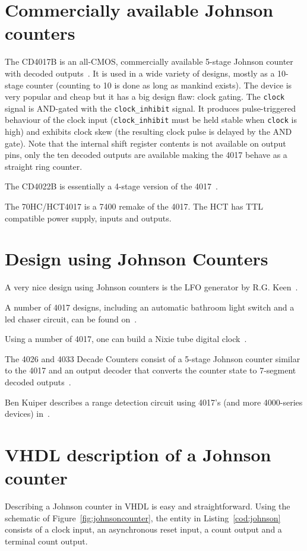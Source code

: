 \documentclass[12pt,a4paper,final,twoside,fleqn]{article}
\begin{document}
\section{Commercially available Johnson counters}
The CD4017B is an all-CMOS, commercially available 5-stage Johnson counter with
decoded outputs~\cite{datasheetcd4017b}. It is used in a wide variety of designs,
mostly as a 10-stage counter (counting to 10 is done as long as mankind exists).
The device is very popular and cheap but it has a big design flaw: clock gating.
The \lstinline|clock| signal is AND-gated with the \lstinline|clock_inhibit|
signal. It produces pulse-triggered behaviour of the clock input
(\lstinline|clock_inhibit| must be held stable when \lstinline|clock| is high) and
exhibits clock skew (the resulting clock pulse is delayed by the AND gate). Note
that the internal shift register contents is not available on output pins, only the
ten decoded outputs are available making the 4017 behave as a straight ring counter. 

The CD4022B is essentially a 4-stage version of the 4017~\cite{datasheetcd4022b}.

The 70HC/HCT4017 is a 7400 remake of the 4017. The HCT has TTL compatible power
supply, inputs and outputs.


\section{Design using Johnson Counters}
A very nice design using Johnson counters is the LFO generator by R.G. Keen~\cite{keen2015}.

A number of 4017 designs, including an automatic bathroom light switch and a
led chaser circuit, can be found on~\cite{electroschematics2015}.

Using a number of 4017, one can build a Nixie tube digital clock~\cite{harrison2015}.

The 4026 and 4033 Decade Counters consist of a 5-stage Johnson counter similar
to the 4017 and an output decoder that converts the counter state to 7-segment
decoded outputs~\cite{datasheetcd4026b}.

Ben Kuiper describes a range detection circuit using 4017's (and more 4000-series 
devices) in~\cite{kuiper2015}.


\section{VHDL description of a Johnson counter}
Describing a Johnson counter in VHDL is easy and straightforward. Using the schematic
of Figure~\ref{fig:johnsoncounter}, the entity in Listing~\ref{cod:johnson} consists
of a clock input, an asynchronous reset input, a count output and a terminal count
output.
\end{document}
